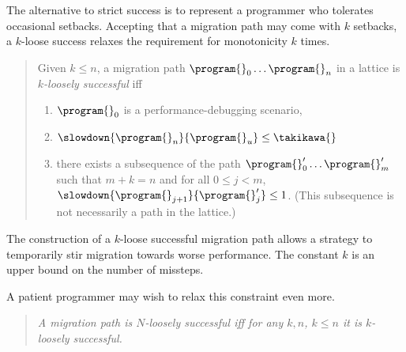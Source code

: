 The alternative to strict success is to represent a programmer who tolerates
occasional setbacks. Accepting that a migration path may come with $k$ setbacks,
a $k$-loose success relaxes the requirement for monotonicity $k$ times.

\begin{quote} \em

Given $k \leq n$, a migration path ${\program{}_0} \ldots {\program{}_n}$ in a
lattice  is \emph{$k$-loosely successful}
iff 
\begin{enumerate}
  \item  $\program{}_0$ is a performance-debugging scenario,
  \item $\slowdown{\program{}_n}{\program{}_u} \leq \takikawa{}$  
  \item there exists a subsequence of the path 
    ${\program{}^\prime_0} \ldots {\program{}^\prime_m}$ such that
     $m + k = n$ and
      for all $0 \leq j < m$,
      $\slowdown{\program{}_{j+1}}{\program{}^\prime_{j}} \leq 1$.
      \subitem (This subsequence is not necessarily a path in the lattice.)
  \end{enumerate} 
\end{quote}
The construction of a $k$-loose successful migration path allows a strategy to
temporarily stir migration towards worse performance. The constant $k$ is an
upper bound on the number of missteps.

A patient programmer may wish to relax this constraint even more.

\begin{quote} \em
A migration path is $N$-loosely successful iff for any $k, n$, $k \leq n$ it is
\emph{$k$-loosely successful}. 
\end{quote}
